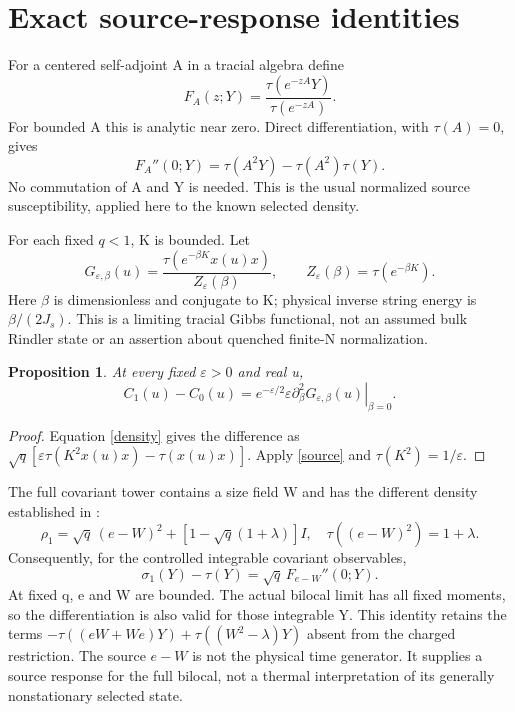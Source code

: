 \documentclass[11pt]{article}
\newtheorem{proposition}{Proposition}
\begin{document}
\newpage
\section{Exact source-response identities}
For a centered self-adjoint A in a tracial algebra define
\[
 F_A(z;Y)=\frac{\tau(e^{-zA}Y)}{\tau(e^{-zA})}.
\]
For bounded A this is analytic near zero. Direct differentiation,
with $\tau(A)=0$, gives
\begin{equation}\label{source}
 F_A''(0;Y)=\tau(A^2Y)-\tau(A^2)\tau(Y).
\end{equation}
No commutation of A and Y is needed. This is the usual normalized
source susceptibility, applied here to the known selected density.

For each fixed $q<1$, K is bounded. Let
\begin{equation}\label{thermal}
 G_{\varepsilon,\beta}(u)=
 \frac{\tau(e^{-\beta K}x(u)x)}{Z_\varepsilon(\beta)},
 \qquad Z_\varepsilon(\beta)=\tau(e^{-\beta K}).
\end{equation}
Here $\beta$ is dimensionless and conjugate to K; physical inverse
string energy is $\beta/(2J_s)$. This is a limiting tracial Gibbs
functional, not an assumed bulk Rindler state or an assertion about
quenched finite-N normalization.
\begin{proposition}
At every fixed $\varepsilon>0$ and real u,
\begin{equation}\label{exact}
 C_1(u)-C_0(u)=e^{-\varepsilon/2}\varepsilon
   \left.\partial_\beta^2G_{\varepsilon,\beta}(u)\right|_{\beta=0}.
\end{equation}
\end{proposition}
\begin{proof}
Equation \eqref{density} gives the difference as
$\sqrt q[\varepsilon\tau(K^2x(u)x)-\tau(x(u)x)]$.
Apply \eqref{source} and $\tau(K^2)=1/\varepsilon$.
\end{proof}

The full covariant tower contains a size field W and has the
different density established in \cite{selected,bilocal}:
\[
 \rho_1=\sqrt q\,(e-W)^2+[1-\sqrt q(1+\lambda)]I,
 \quad\tau((e-W)^2)=1+\lambda.
\]
Consequently, for the controlled integrable covariant observables,
\begin{equation}\label{full}
 \sigma_1(Y)-\tau(Y)=\sqrt q\,F_{e-W}''(0;Y).
\end{equation}
At fixed q, e and W are bounded. The actual bilocal limit has all
fixed moments, so the differentiation is also valid for those
integrable Y. This identity retains the terms
$-\tau((eW+We)Y)+\tau((W^2-\lambda)Y)$ absent from the charged
restriction. The source $e-W$ is not the physical time generator.
It supplies a source response for the full bilocal, not a thermal
interpretation of its generally nonstationary selected state.
\end{document}
